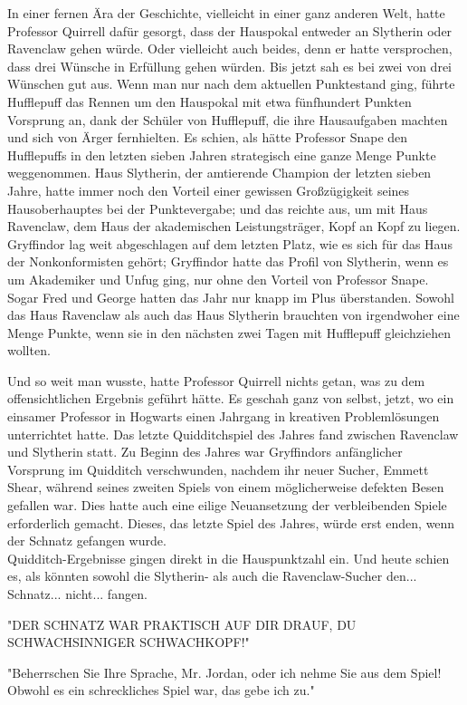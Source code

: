 {In einer fernen Ära der Geschichte, vielleicht in einer ganz anderen Welt, hatte Professor Quirrell dafür gesorgt, dass der Hauspokal entweder an Slytherin oder Ravenclaw gehen würde. Oder vielleicht auch beides, denn er hatte versprochen, dass drei Wünsche in Erfüllung gehen würden. Bis jetzt sah es bei zwei von drei Wünschen gut aus. Wenn man nur nach dem aktuellen Punktestand ging, führte Hufflepuff das Rennen um den Hauspokal mit etwa fünfhundert Punkten Vorsprung an, dank der Schüler von Hufflepuff, die ihre Hausaufgaben machten und sich von Ärger fernhielten. Es schien, als hätte Professor Snape den Hufflepuffs in den letzten sieben Jahren strategisch eine ganze Menge Punkte weggenommen. Haus Slytherin, der amtierende Champion der letzten sieben Jahre, hatte immer noch den Vorteil einer gewissen Großzügigkeit seines Hausoberhauptes bei der Punktevergabe; und das reichte aus, um mit Haus Ravenclaw, dem Haus der akademischen Leistungsträger, Kopf an Kopf zu liegen. Gryffindor lag weit abgeschlagen auf dem letzten Platz, wie es sich für das Haus der Nonkonformisten gehört; Gryffindor hatte das Profil von Slytherin, wenn es um Akademiker und Unfug ging, nur ohne den Vorteil von Professor Snape. Sogar Fred und George hatten das Jahr nur knapp im Plus überstanden. Sowohl das Haus Ravenclaw als auch das Haus Slytherin brauchten von irgendwoher eine Menge Punkte, wenn sie in den nächsten zwei Tagen mit Hufflepuff gleichziehen wollten.

Und so weit man wusste, hatte Professor Quirrell nichts getan, was zu dem offensichtlichen Ergebnis geführt hätte. Es geschah ganz von selbst, jetzt, wo ein einsamer Professor in Hogwarts einen Jahrgang in kreativen Problemlösungen unterrichtet hatte. Das letzte Quidditchspiel des Jahres fand zwischen Ravenclaw und Slytherin statt. Zu Beginn des Jahres war Gryffindors anfänglicher Vorsprung im Quidditch verschwunden, nachdem ihr neuer Sucher, Emmett Shear, während seines zweiten Spiels von einem möglicherweise defekten Besen gefallen war. Dies hatte auch eine eilige Neuansetzung der verbleibenden Spiele erforderlich gemacht. Dieses, das letzte Spiel des Jahres, würde erst enden, wenn der Schnatz gefangen wurde.\\ Quidditch-Ergebnisse gingen direkt in die Hauspunktzahl ein. Und heute schien es, als könnten sowohl die Slytherin- als auch die Ravenclaw-Sucher den... Schnatz... nicht... fangen.

"DER SCHNATZ WAR PRAKTISCH AUF DIR DRAUF, DU SCHWACHSINNIGER SCHWACHKOPF!"

"Beherrschen Sie Ihre Sprache, Mr. Jordan, oder ich nehme Sie aus dem Spiel! Obwohl es ein schreckliches Spiel war, das gebe ich zu."

}

